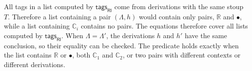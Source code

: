 \documentclass[submission,copyright,creativecommons]{eptcs}
\theoremstyle{definition}
\newcommand{\lleft}{{\multimap}\mathsf{L}}
\newcommand{\RI}{\mathsf{RI}}
\newcommand{\tCone}{\mathbb{C}_1}
\newcommand{\tCtwo}{\mathbb{C}_2}
\newcommand{\tE}{\mathbb{R}}
\begin{document}
All tags in a list computed by $\mathsf{tags}_{\RI}$ come from derivations with the same stoup $T$. Therefore a list containing a pair $(\Lambda,h)$ would contain only pairs, $\tE$ and $\bullet$, while a list containing $\mathbb{C}_i$ contains no pairs. The equations therefore cover all lists computed by $\mathsf{tags}_{\RI}$. When $\Lambda=\Lambda'$, the derivations $h$ and $h'$ have the same conclusion, so their equality can be checked. The predicate holds exactly when the list contains $\tE$ or $\bullet$, both $\tCone$ and $\tCtwo$, or two pairs with different contexts or different derivations.
\end{document}
